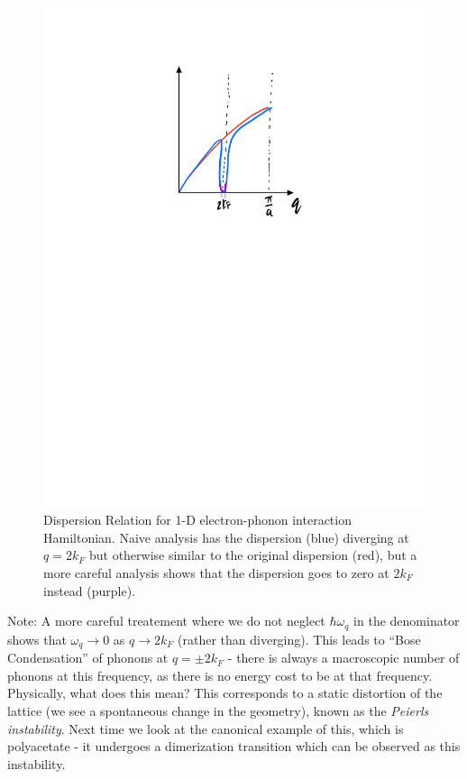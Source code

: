 \begin{figure}[htbp]
    \centering
    \includegraphics[scale=0.7]{Images/fig-peirelsdispersion.pdf}
    \caption{Dispersion Relation for 1-D electron-phonon interaction Hamiltonian. Naive analysis has the dispersion (blue) diverging at $q = 2k_F$ but otherwise similar to the original dispersion (red), but a more careful analysis shows that the dispersion goes to zero at $2k_F$ instead (purple).}
    \label{fig-peirelsdispersion}
\end{figure}

Note: A more careful treatement where we do not neglect $\hbar \omega_q$ in the denominator shows that $\omega_q \to 0$ as $q \to 2k_F$ (rather than diverging). This leads to ``Bose Condensation'' of phonons at $q = \pm 2k_F$ - there is always a macroscopic number of phonons at this frequency, as there is no energy cost to be at that frequency. Physically, what does this mean? This corresponds to a static distortion of the lattice (we see a spontaneous change in the geometry), known as the \emph{Peierls instability}. Next time we look at the canonical example of this, which is polyacetate - it undergoes a dimerization transition which can be observed as this instability.
